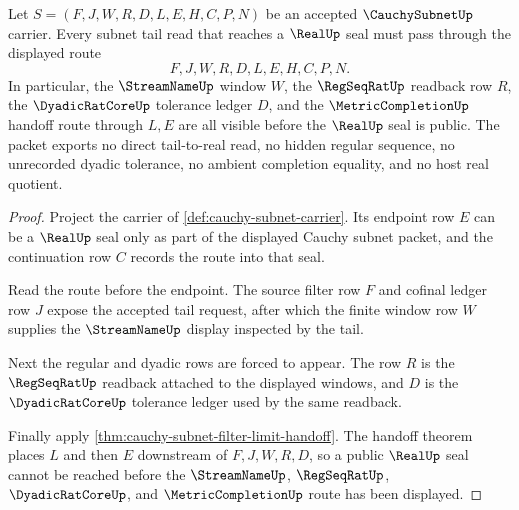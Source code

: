 \begin{theorem}
\label{thm:cauchysubnet-regseqrat-tail-handoff}
Let $S=(F,J,W,R,D,L,E,H,C,P,N)$ be an accepted $\CauchySubnetUp$ carrier. Every subnet tail read that reaches a $\RealUp$ seal must pass through the displayed route
$$
F,J,W,R,D,L,E,H,C,P,N .
$$
In particular, the $\StreamNameUp$ window $W$, the $\RegSeqRatUp$ readback row $R$, the $\DyadicRatCoreUp$ tolerance ledger $D$, and the $\MetricCompletionUp$ handoff route through $L,E$ are all visible before the $\RealUp$ seal is public. The packet exports no direct tail-to-real read, no hidden regular sequence, no unrecorded dyadic tolerance, no ambient completion equality, and no host real quotient.
\end{theorem}
\begin{proof}
Project the carrier of \autoref{def:cauchy-subnet-carrier}. Its endpoint row $E$ can be a $\RealUp$ seal only as part of the displayed Cauchy subnet packet, and the continuation row $C$ records the route into that seal.

Read the route before the endpoint. The source filter row $F$ and cofinal ledger row $J$ expose the accepted tail request, after which the finite window row $W$ supplies the $\StreamNameUp$ display inspected by the tail.

Next the regular and dyadic rows are forced to appear. The row $R$ is the $\RegSeqRatUp$ readback attached to the displayed windows, and $D$ is the $\DyadicRatCoreUp$ tolerance ledger used by the same readback.

Finally apply \autoref{thm:cauchy-subnet-filter-limit-handoff}. The handoff theorem places $L$ and then $E$ downstream of $F,J,W,R,D$, so a public $\RealUp$ seal cannot be reached before the $\StreamNameUp$, $\RegSeqRatUp$, $\DyadicRatCoreUp$, and $\MetricCompletionUp$ route has been displayed.
\end{proof}

